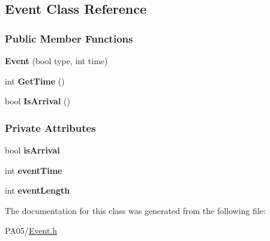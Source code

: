\hypertarget{class_event}{}\subsection{Event Class Reference}
\label{class_event}
\subsubsection*{Public Member Functions}
\begin{DoxyCompactItemize}
\item 
{\bfseries Event} (bool type, int time)\hypertarget{class_event_adeff03724f194b935327f91e0264afed}{}\label{class_event_adeff03724f194b935327f91e0264afed}

\item 
int {\bfseries Get\+Time} ()\hypertarget{class_event_aa9bbdeda74cd0fb447d0090c08738914}{}\label{class_event_aa9bbdeda74cd0fb447d0090c08738914}

\item 
bool {\bfseries Is\+Arrival} ()\hypertarget{class_event_a1044e1368aee347fe55e971e4aecd4a7}{}\label{class_event_a1044e1368aee347fe55e971e4aecd4a7}

\end{DoxyCompactItemize}
\subsubsection*{Private Attributes}
\begin{DoxyCompactItemize}
\item 
bool {\bfseries is\+Arrival}\hypertarget{class_event_af4e7ea43f917d4f45704041a1860e452}{}\label{class_event_af4e7ea43f917d4f45704041a1860e452}

\item 
int {\bfseries event\+Time}\hypertarget{class_event_a29dd6c6828ccf273691de68949e2c6ee}{}\label{class_event_a29dd6c6828ccf273691de68949e2c6ee}

\item 
int {\bfseries event\+Length}\hypertarget{class_event_a8c71c337129e41ef2ce8bdddd68f3852}{}\label{class_event_a8c71c337129e41ef2ce8bdddd68f3852}

\end{DoxyCompactItemize}


The documentation for this class was generated from the following file\+:\begin{DoxyCompactItemize}
\item 
P\+A05/\hyperlink{_event_8h}{Event.\+h}\end{DoxyCompactItemize}
